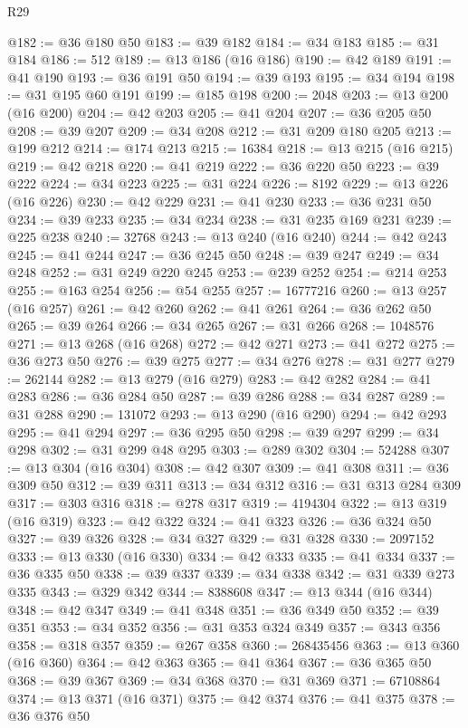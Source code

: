 \begin{lexlean}{R29}
\begin{coremodule}
@182 := @36 @180 @50
@183 := @39 @182
@184 := @34 @183
@185 := @31 @184
@186 := 512
@189 := @13 @186 (@16 @186)
@190 := @42 @189
@191 := @41 @190
@193 := @36 @191 @50
@194 := @39 @193
@195 := @34 @194
@198 := @31 @195 @60 @191
@199 := @185 @198
@200 := 2048
@203 := @13 @200 (@16 @200)
@204 := @42 @203
@205 := @41 @204
@207 := @36 @205 @50
@208 := @39 @207
@209 := @34 @208
@212 := @31 @209 @180 @205
@213 := @199 @212
@214 := @174 @213
@215 := 16384
@218 := @13 @215 (@16 @215)
@219 := @42 @218
@220 := @41 @219
@222 := @36 @220 @50
@223 := @39 @222
@224 := @34 @223
@225 := @31 @224
@226 := 8192
@229 := @13 @226 (@16 @226)
@230 := @42 @229
@231 := @41 @230
@233 := @36 @231 @50
@234 := @39 @233
@235 := @34 @234
@238 := @31 @235 @169 @231
@239 := @225 @238
@240 := 32768
@243 := @13 @240 (@16 @240)
@244 := @42 @243
@245 := @41 @244
@247 := @36 @245 @50
@248 := @39 @247
@249 := @34 @248
@252 := @31 @249 @220 @245
@253 := @239 @252
@254 := @214 @253
@255 := @163 @254
@256 := @54 @255
@257 := 16777216
@260 := @13 @257 (@16 @257)
@261 := @42 @260
@262 := @41 @261
@264 := @36 @262 @50
@265 := @39 @264
@266 := @34 @265
@267 := @31 @266
@268 := 1048576
@271 := @13 @268 (@16 @268)
@272 := @42 @271
@273 := @41 @272
@275 := @36 @273 @50
@276 := @39 @275
@277 := @34 @276
@278 := @31 @277
@279 := 262144
@282 := @13 @279 (@16 @279)
@283 := @42 @282
@284 := @41 @283
@286 := @36 @284 @50
@287 := @39 @286
@288 := @34 @287
@289 := @31 @288
@290 := 131072
@293 := @13 @290 (@16 @290)
@294 := @42 @293
@295 := @41 @294
@297 := @36 @295 @50
@298 := @39 @297
@299 := @34 @298
@302 := @31 @299 @48 @295
@303 := @289 @302
@304 := 524288
@307 := @13 @304 (@16 @304)
@308 := @42 @307
@309 := @41 @308
@311 := @36 @309 @50
@312 := @39 @311
@313 := @34 @312
@316 := @31 @313 @284 @309
@317 := @303 @316
@318 := @278 @317
@319 := 4194304
@322 := @13 @319 (@16 @319)
@323 := @42 @322
@324 := @41 @323
@326 := @36 @324 @50
@327 := @39 @326
@328 := @34 @327
@329 := @31 @328
@330 := 2097152
@333 := @13 @330 (@16 @330)
@334 := @42 @333
@335 := @41 @334
@337 := @36 @335 @50
@338 := @39 @337
@339 := @34 @338
@342 := @31 @339 @273 @335
@343 := @329 @342
@344 := 8388608
@347 := @13 @344 (@16 @344)
@348 := @42 @347
@349 := @41 @348
@351 := @36 @349 @50
@352 := @39 @351
@353 := @34 @352
@356 := @31 @353 @324 @349
@357 := @343 @356
@358 := @318 @357
@359 := @267 @358
@360 := 268435456
@363 := @13 @360 (@16 @360)
@364 := @42 @363
@365 := @41 @364
@367 := @36 @365 @50
@368 := @39 @367
@369 := @34 @368
@370 := @31 @369
@371 := 67108864
@374 := @13 @371 (@16 @371)
@375 := @42 @374
@376 := @41 @375
@378 := @36 @376 @50

\end{coremodule}
\end{lexlean}
